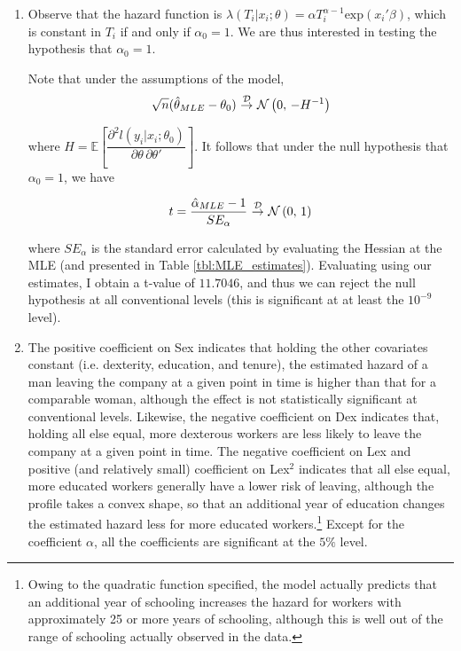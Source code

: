 \documentclass[]{report}
\newcommand{\0}{\bv{0}}
\newcommand{\1}{\bv{1}}
\newcommand{\parens}[1]{\left(#1\right)}
\newcommand{\bracks}[1]{\left[#1\right]}
\newcommand{\expe}[1]{\mathbb{E}\bracks{#1}}
\renewcommand{\exp}[1]{\mathrm{exp}\parens{#1}}
\newcommand{\partialdtwo}[3]{ \dfrac{\partial^2 #1}{\partial #2 \, \partial #3}}
\newcommand{\normnot}[2]{\mathcal{N}\parens{#1,\,#2}}
\newcommand{\convd}{~{\buildrel \mathcal{D} \over \rightarrow}~}
\begin{document}
\begin{enumerate}[1.]
\begin{enumerate}
\item
Observe that the hazard function is $\lambda(T_i|x_i;\theta) = \alpha T_i^{\alpha-1} \exp{x_i' \beta}$, which is constant in $T_i$ if and only if $\alpha_0 = 1$. We are thus interested in testing the hypothesis that $\alpha_0 = 1$. 

Note that under the assumptions of the model,
\begin{align}
\sqrt{n} (\hat{\theta}_{MLE} - \theta_0) \convd \normnot{0}{-H^{-1}}
\end{align}

where $H = \expe{\partialdtwo{l(y_i|x_i; \theta_0)}{\theta}{\theta'}}$. It follows that under the null hypothesis that $\alpha_0 = 1$, we have

\begin{align}
	t = \dfrac{\hat{\alpha}_{MLE} - 1}{SE_{\alpha}} \convd \normnot{0}{1}
\end{align}

where $SE_{\alpha}$ is the standard error calculated by evaluating the Hessian at the MLE (and presented in Table \ref{tbl:MLE_estimates}). Evaluating using our estimates, I obtain a t-value of $11.7046$, and thus we can reject the null hypothesis at all conventional levels (this is significant at at least the $10^{-9}$ level).

\item

The positive coefficient on Sex indicates that holding the other covariates constant (i.e. dexterity, education, and tenure), the estimated hazard of a man leaving the company at a given point in time is higher than that for a comparable woman, although the effect is not statistically significant at conventional levels. Likewise, the negative coefficient on Dex indicates that, holding all else equal, more dexterous workers are less likely to leave the company at a given point in time. The negative coefficient on Lex and positive (and relatively small) coefficient on Lex$^2$ indicates that all else equal, more educated workers generally have a lower risk of leaving, although the profile takes a convex shape, so that an additional year of education changes the estimated hazard less for more educated workers.\footnote{Owing to the quadratic function specified, the model actually predicts that an additional year of schooling increases the hazard for workers with approximately 25 or more years of schooling, although this is well out of the range of schooling actually observed in the data.} Except for the coefficient $\alpha$, all the coefficients are significant at the $5\%$ level.


\end{enumerate}
\end{enumerate}
\end{document}
